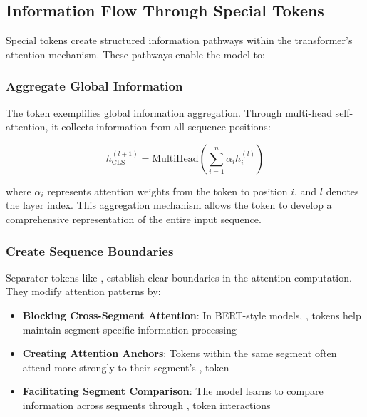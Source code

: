 \subsection{Information Flow Through Special Tokens}

Special tokens create structured information pathways within the transformer's attention mechanism. These pathways enable the model to:

\subsubsection{Aggregate Global Information}

The \cls{} token exemplifies global information aggregation. Through multi-head self-attention, it collects information from all sequence positions:

\begin{equation}
h_{\text{CLS}}^{(l+1)} = \text{MultiHead}\left(\sum_{i=1}^{n} \alpha_{i} h_i^{(l)}\right)
\end{equation}

where $\alpha_i$ represents attention weights from the \cls{} token to position $i$, and $l$ denotes the layer index. This aggregation mechanism allows the \cls{} token to develop a comprehensive representation of the entire input sequence.
\begin{comment}
Feedback: The equation is correct, but it might be helpful to add a plain-language explanation of what it means. For example: "In simple terms, this equation shows that the [CLS] token's representation at the next layer is a weighted sum of all the other tokens' representations from the current layer. The attention scores determine the weights, allowing the [CLS] token to 'listen' most closely to the most important parts of the sequence."
\end{comment}

\subsubsection{Create Sequence Boundaries}

Separator tokens like \sep{} establish clear boundaries in the attention computation. They modify attention patterns by:

\begin{itemize}
\item \textbf{Blocking Cross-Segment Attention}: In BERT-style models, \sep{} tokens help maintain segment-specific information processing
\item \textbf{Creating Attention Anchors}: Tokens within the same segment often attend more strongly to their segment's \sep{} token
\item \textbf{Facilitating Segment Comparison}: The model learns to compare information across segments through \sep{} token interactions
\end{itemize}

